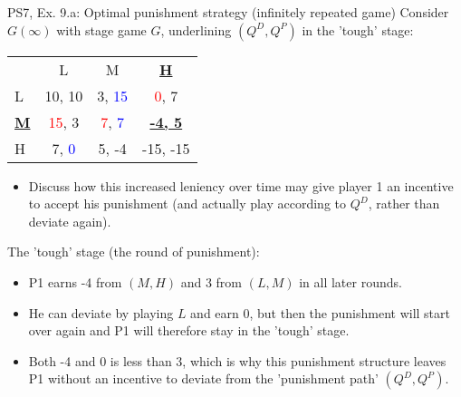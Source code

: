 \begin{frame}{PS7, Ex. 9.a: Optimal punishment strategy (infinitely repeated game)}
    Consider $G(\infty)$ with stage game $G$, underlining $(Q^D,Q^P)$ in the 'tough' stage: \vspace{-6pt}
    \begin{table}
      \begin{tabular}{l|c|c|c|}
        \multicolumn{1}{c}{} & \multicolumn{1}{c}{L} & \multicolumn{1}{c}{M} & \multicolumn{1}{c}{\textbf{\underline{H}}} \\\cline{2-4}
        L & 10, 10 & 3, \textcolor{blue}{15} & \textcolor{red}{0}, 7 \\\cline{2-4}
        \textbf{\underline{M}} & \textcolor{red}{15}, 3 & \textcolor{red}{7}, \textcolor{blue}{7} & \textbf{\underline{-4, 5}} \\\cline{2-4}
        H & 7, \textcolor{blue}{0} & 5, -4 & -15, -15 \\\cline{2-4}
      \end{tabular}
    \end{table}
    \vspace{-4pt}
    \begin{itemize}
      \item[(a)] Discuss how this increased leniency over time may give player 1 an incentive to accept his punishment (and actually play according to $Q^D$, rather than deviate again).
    \end{itemize}
    \vspace{-8pt}
    \begin{multicols}{2}
      The 'tough' stage (the  round of punishment):\vspace{-4pt}
      \begin{itemize}
        \item P1 earns -4 from $(M, H)$ and 3 from $(L, M)$ in all later rounds.
        \item He can deviate by playing $L$ and earn 0, but then the punishment will start over again and P1 will therefore stay in the 'tough' stage.
        \item Both -4 and 0 is less than 3, which is why this punishment structure leaves P1 without an incentive to deviate from the 'punishment path' $(Q^D,Q^P)$.
      \end{itemize}
      \vfill\null\columnbreak
      \vfill\null
    \end{multicols}
\end{frame}
